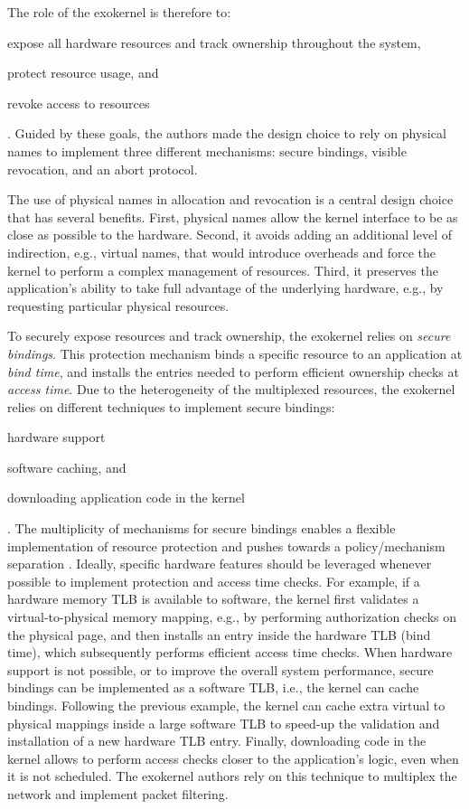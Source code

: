 The role of the exokernel is therefore to:
\begin{enumerate*}
	\item \label{expose} expose all hardware resources and track ownership throughout the system,
	\item \label{protect} protect resource usage, and
	\item \label{revoke} revoke access to resources
\end{enumerate*}.
Guided by these goals, the authors made the design choice to rely on physical names to implement three different mechanisms: secure bindings, visible revocation, and an abort protocol.

The use of physical names in allocation and revocation is a central design choice that has several benefits.
First, physical names allow the kernel interface to be as close as possible to the hardware.
Second, it avoids adding an additional level of indirection, e.g., virtual names, that would introduce overheads and force the kernel to perform a complex management of resources.
Third, it preserves the application's ability to take full advantage of the underlying hardware, e.g., by requesting particular physical resources.

To securely expose resources and track ownership, the exokernel relies on \emph{secure bindings}.
This protection mechanism binds a specific resource to an application at \emph{bind time}, and installs the entries needed to perform efficient ownership checks at \emph{access time}.
Due to the heterogeneity of the multiplexed resources, the exokernel relies on different techniques to implement secure bindings:
\begin{enumerate*}
	\item hardware support
	\item software caching, and
	\item downloading application code in the kernel
\end{enumerate*}.
The multiplicity of mechanisms for secure bindings enables a flexible implementation of resource protection and pushes towards a policy/mechanism separation \cite{DBLP:journals/cacm/LampsonS76}.
Ideally, specific hardware features should be leveraged whenever possible to implement protection and access time checks.
For example, if a hardware memory TLB is available to software, the kernel first validates a virtual-to-physical memory mapping, e.g., by performing authorization checks on the physical page, and then installs an entry inside the hardware TLB (bind time), which subsequently performs efficient access time checks.
When hardware support is not possible, or to improve the overall system performance, secure bindings can be implemented as a software TLB, i.e., the kernel can cache bindings.
Following the previous example, the kernel can cache extra virtual to physical mappings inside a large software TLB to speed-up the validation and installation of a new hardware TLB entry.
Finally, downloading code in the kernel allows to perform access checks closer to the application's logic, even when it is not scheduled.
The exokernel authors rely on this technique to multiplex the network and implement packet filtering.

